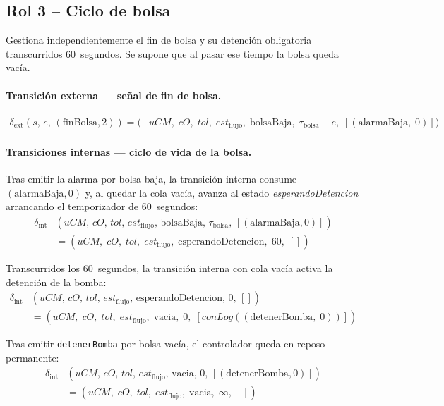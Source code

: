 \documentclass{article}
\begin{document}
\subsection{Rol 3 – Ciclo de bolsa}

Gestiona independientemente el fin de bolsa y su detención obligatoria
transcurridos 60~segundos. Se supone que al pasar ese tiempo la bolsa
queda vacía.

\paragraph{Transición externa — señal de fin de bolsa.}
\begin{align*}
  \delta_{\mathrm{ext}}(s,\,e,\,(\mathrm{finBolsa},2))
  = \bigl(&uCM,\;cO,\;tol,\;est_{\mathrm{flujo}},\;\mathrm{bolsaBaja},\;
           \tau_{\mathrm{bolsa}}-e,\;
           [(\mathrm{alarmaBaja},\;0)]\bigr)
\end{align*}

\paragraph{Transiciones internas — ciclo de vida de la bolsa.}

Tras emitir la alarma por bolsa baja, la transición interna consume
$(\mathrm{alarmaBaja}, 0)$ y, al quedar la cola vacía, avanza al estado
\textit{esperandoDetencion} arrancando el temporizador de 60~segundos:
\begin{align*}
  \delta_{\mathrm{int}}&(uCM,\,cO,\,tol,\,est_{\mathrm{flujo}},\,
    \mathrm{bolsaBaja},\,\tau_{\mathrm{bolsa}},\,[(\mathrm{alarmaBaja},0)]) \\
  &= (uCM,\;cO,\;tol,\;est_{\mathrm{flujo}},\;
      \mathrm{esperandoDetencion},\;60,\;[])
\end{align*}

Transcurridos los 60~segundos, la transición interna con cola vacía activa
la detención de la bomba:
\begin{align*}
  \delta_{\mathrm{int}}&(uCM,\,cO,\,tol,\,est_{\mathrm{flujo}},\,
    \mathrm{esperandoDetencion},\,0,\,[]) \\
  &= (uCM,\;cO,\;tol,\;est_{\mathrm{flujo}},\;
      \mathrm{vacia},\;0,\;[conLog((\mathrm{detenerBomba},\;0))])
\end{align*}

Tras emitir \texttt{detenerBomba} por bolsa vacía, el controlador queda
en reposo permanente:
\begin{align*}
  \delta_{\mathrm{int}}&(uCM,\,cO,\,tol,\,est_{\mathrm{flujo}},\,
    \mathrm{vacia},\,0,\,[(\mathrm{detenerBomba},0)]) \\
  &= (uCM,\;cO,\;tol,\;est_{\mathrm{flujo}},\;
      \mathrm{vacia},\;\infty,\;[])
\end{align*}
\end{document}
